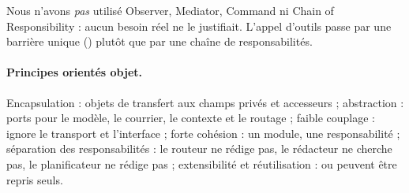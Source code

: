 Nous n'avons \emph{pas} utilisé Observer, Mediator, Command ni Chain of Responsibility : aucun besoin réel ne le justifiait. L'appel d'outils passe par une barrière unique () plutôt que par une chaîne de responsabilités.

\paragraph{Principes orientés objet.} Encapsulation : objets de transfert aux champs privés et accesseurs ; abstraction : ports pour le modèle, le courrier, le contexte et le routage ; faible couplage :  ignore le transport et l'interface ; forte cohésion : un module, une responsabilité ; séparation des responsabilités : le routeur ne rédige pas, le rédacteur ne cherche pas, le planificateur ne rédige pas ; extensibilité et réutilisation :  ou  peuvent être repris seuls.

